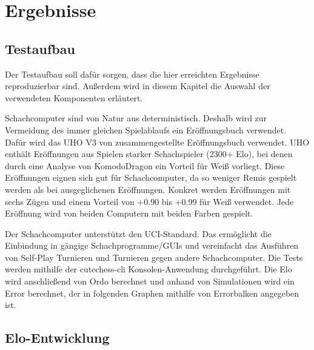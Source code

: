 \chapter{Ergebnisse}
\label{chap:Ergebnisse}

\section{Testaufbau}

Der Testaufbau soll dafür sorgen, dass die hier erreichten Ergebnisse reproduzierbar sind. Außerdem wird in diesem Kapitel die Auswahl der verwendeten Komponenten erläutert.

Schachcomputer sind von Natur aus deterministisch. Deshalb wird zur Vermeidung des immer gleichen Spielablaufs ein Eröffnungsbuch verwendet. Dafür wird das \ac{UHO} V3 von \citeauthor{Pohl2021} \cite{Pohl2021} zusammengestellte Eröffnungsbuch verwendet. \ac{UHO} enthält Eröffnungen aus Spielen starker Schachspieler (2300+ Elo), bei denen durch eine Analyse von KomodoDragon \cite{KomodoDragon} ein Vorteil für Weiß vorliegt. Diese Eröffnungen eignen sich gut für Schachcomputer, da so weniger Remis gespielt werden als bei ausgeglichenen Eröffnungen. Konkret werden Eröffnungen mit sechs Zügen und einem Vorteil von +0.90 bis +0.99 für Weiß verwendet. Jede Eröffnung wird von beiden Computern mit beiden Farben gespielt.

Der Schachcomputer unterstützt den \ac{UCI}-Standard. Das ermöglicht die Einbindung in gängige Schachprogramme/GUIs und vereinfacht das Ausführen von Self-Play Turnieren und Turnieren gegen andere Schachcomputer. Die Tests werden mithilfe der cutechess-cli \cite{CutechessRepo} Konsolen-Anwendung durchgeführt. Die Elo wird anschließend von Ordo \cite{OrdoRepo} berechnet und anhand von Simulationen wird ein Error berechnet, der in folgenden Graphen mithilfe von Errorbalken angegeben ist.

\section{Elo-Entwicklung}



